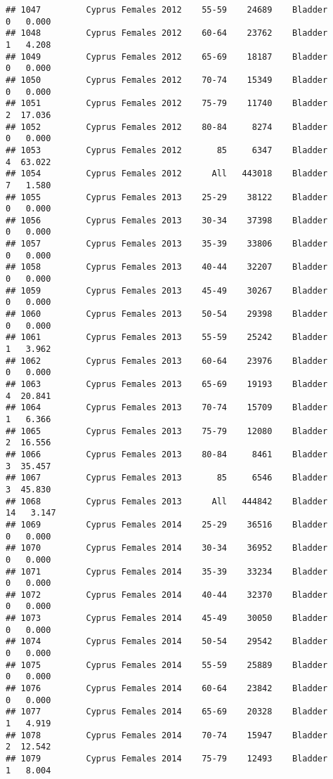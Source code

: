 \documentclass[
]{article}
\begin{document}
\begin{verbatim}
## 1047         Cyprus Females 2012    55-59    24689    Bladder      0   0.000
## 1048         Cyprus Females 2012    60-64    23762    Bladder      1   4.208
## 1049         Cyprus Females 2012    65-69    18187    Bladder      0   0.000
## 1050         Cyprus Females 2012    70-74    15349    Bladder      0   0.000
## 1051         Cyprus Females 2012    75-79    11740    Bladder      2  17.036
## 1052         Cyprus Females 2012    80-84     8274    Bladder      0   0.000
## 1053         Cyprus Females 2012       85     6347    Bladder      4  63.022
## 1054         Cyprus Females 2012      All   443018    Bladder      7   1.580
## 1055         Cyprus Females 2013    25-29    38122    Bladder      0   0.000
## 1056         Cyprus Females 2013    30-34    37398    Bladder      0   0.000
## 1057         Cyprus Females 2013    35-39    33806    Bladder      0   0.000
## 1058         Cyprus Females 2013    40-44    32207    Bladder      0   0.000
## 1059         Cyprus Females 2013    45-49    30267    Bladder      0   0.000
## 1060         Cyprus Females 2013    50-54    29398    Bladder      0   0.000
## 1061         Cyprus Females 2013    55-59    25242    Bladder      1   3.962
## 1062         Cyprus Females 2013    60-64    23976    Bladder      0   0.000
## 1063         Cyprus Females 2013    65-69    19193    Bladder      4  20.841
## 1064         Cyprus Females 2013    70-74    15709    Bladder      1   6.366
## 1065         Cyprus Females 2013    75-79    12080    Bladder      2  16.556
## 1066         Cyprus Females 2013    80-84     8461    Bladder      3  35.457
## 1067         Cyprus Females 2013       85     6546    Bladder      3  45.830
## 1068         Cyprus Females 2013      All   444842    Bladder     14   3.147
## 1069         Cyprus Females 2014    25-29    36516    Bladder      0   0.000
## 1070         Cyprus Females 2014    30-34    36952    Bladder      0   0.000
## 1071         Cyprus Females 2014    35-39    33234    Bladder      0   0.000
## 1072         Cyprus Females 2014    40-44    32370    Bladder      0   0.000
## 1073         Cyprus Females 2014    45-49    30050    Bladder      0   0.000
## 1074         Cyprus Females 2014    50-54    29542    Bladder      0   0.000
## 1075         Cyprus Females 2014    55-59    25889    Bladder      0   0.000
## 1076         Cyprus Females 2014    60-64    23842    Bladder      0   0.000
## 1077         Cyprus Females 2014    65-69    20328    Bladder      1   4.919
## 1078         Cyprus Females 2014    70-74    15947    Bladder      2  12.542
## 1079         Cyprus Females 2014    75-79    12493    Bladder      1   8.004

\end{verbatim}
\end{document}
